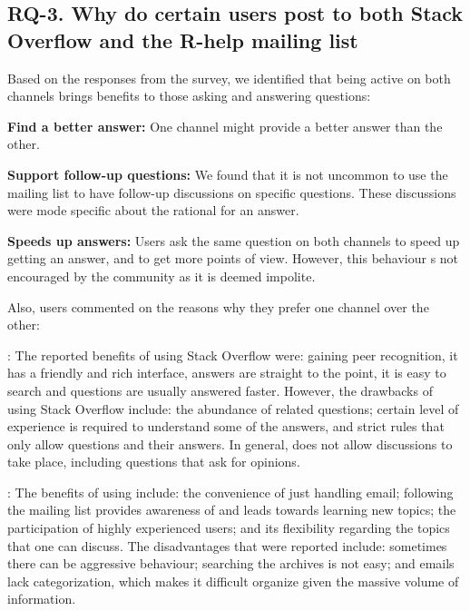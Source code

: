\subsection{RQ-3. Why do certain users post to both Stack Overflow and the R-help mailing list}

Based on the responses from the survey, we identified that being active on both channels brings benefits to those asking and answering questions:

\begin{packed_enum}
\item \textbf{Find a better answer:} One channel might provide a better answer than the other.
\item \textbf{Support follow-up questions:} We found that it is not uncommon to use the mailing list to have follow-up discussions on specific \SO
  questions. These discussions were mode specific about the rational for an answer.
\item \textbf{Speeds up answers:} Users ask the same question on both channels to speed up getting an answer, and to get more points of view. However, this behaviour s not encouraged by the community as it is deemed impolite.
\end{packed_enum}

 Also, users commented on the reasons why they prefer one channel over the other:

\noindent\textbf{\SO}:
    The reported benefits of using Stack Overflow were: gaining peer recognition, it has a friendly and rich interface, answers are straight to the point, it is
    easy to search and questions are usually answered faster.
    However, the drawbacks of using Stack Overflow include: the abundance
    of related questions; certain level of experience is required to understand some of the answers, and \SO strict rules that only allow questions and their answers. In
    general, \SO does not allow discussions to take place, including questions that ask for opinions.

\noindent\textbf{\RH}:
The benefits of using \RH include: the convenience of just handling email; following the mailing list provides awareness of and leads towards
learning new topics; the participation of highly experienced
users; and its flexibility regarding the topics that one can discuss.  The disadvantages that were reported include: sometimes there can be aggressive
behaviour; searching the archives is not easy; and emails lack categorization, which makes it difficult organize given the massive volume of information.

